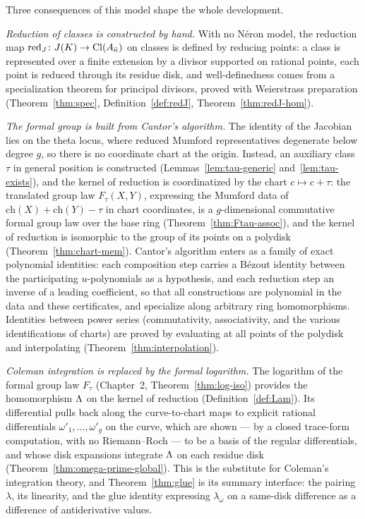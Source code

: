 Three consequences of this model shape the whole development.

\emph{Reduction of classes is constructed by hand.} With no N\'eron model, the reduction
map $\operatorname{red}_J \colon J(K) \to \operatorname{Cl}(A_{\bar\kappa})$ on classes is defined by reducing points:
a class is represented over a finite extension by a divisor supported on rational points,
each point is reduced through its residue disk, and well-definedness comes from a
specialization theorem for principal divisors, proved with Weierstrass preparation
(Theorem~\ref{thm:spec}, Definition~\ref{def:redJ}, Theorem~\ref{thm:redJ-hom}).

\emph{The formal group is built from Cantor's algorithm.} The identity of the Jacobian
lies on the theta locus, where reduced Mumford representatives degenerate below degree
$g$, so there is no coordinate chart at the origin. Instead, an auxiliary class $\tau$ in
general position is constructed (Lemmas~\ref{lem:tau-generic} and~\ref{lem:tau-exists}),
and the kernel of reduction is coordinatized by the chart $c \mapsto c + \tau$: the
translated group law
$F_\tau(X,Y)$, expressing the Mumford data of $\mathrm{ch}(X) + \mathrm{ch}(Y) - \tau$ in
chart coordinates, is a $g$-dimensional commutative formal group law over the base ring
(Theorem~\ref{thm:Ftau-assoc}), and the kernel of reduction is isomorphic to the group of
its points on a polydisk (Theorem~\ref{thm:chart-mem}). Cantor's algorithm enters as a
family of exact polynomial identities: each composition step carries a B\'ezout identity
between the participating $u$-polynomials as a hypothesis, and each reduction step an
inverse of a leading coefficient, so that all constructions are polynomial in the data and
these certificates, and specialize along arbitrary ring homomorphisms. Identities between
power series (commutativity, associativity, and the various identifications of charts) are
proved by evaluating at all points of the polydisk and interpolating
(Theorem~\ref{thm:interpolation}).

\emph{Coleman integration is replaced by the formal logarithm.} The logarithm of the
formal group law $F_\tau$ (Chapter~2, Theorem~\ref{thm:log-iso}) provides the homomorphism
$\Lambda$ on the kernel of reduction (Definition~\ref{def:Lam}). Its differential pulls back
along the curve-to-chart maps to explicit rational differentials $\omega'_1, \dots,
\omega'_g$ on the curve, which are shown --- by a closed trace-form computation, with no
Riemann--Roch --- to be a basis of the regular differentials, and whose disk expansions
integrate $\Lambda$ on each residue disk (Theorem~\ref{thm:omega-prime-global}). This is the
substitute for Coleman's integration theory, and Theorem~\ref{thm:glue} is its summary
interface: the pairing $\lambda$, its linearity, and the glue identity expressing
$\lambda_\omega$ on a same-disk difference as a difference of antiderivative values.

